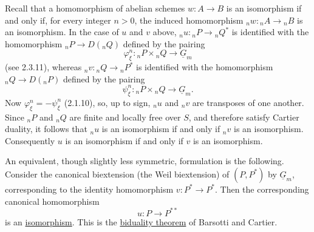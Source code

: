 Recall that a homomorphism of abelian schemes $w:A\longrightarrow B$
is an isomorphism if and only if, for every integer $n>0$, the induced
homomorphism ${}_nw:{}_nA\longrightarrow{}_nB$ is an isomorphism.  In
the case of $u$ and $v$ above, ${}_nu:{}_nP\longrightarrow{}_nQ^*$ is
identified with the homomorphism
${}_nP\longrightarrow D({}_nQ)$ defined by the pairing
\[
 \varphi_\xi^n:{}_nP\times{}_nQ\longrightarrow\underline G_m
\]
(see 2.3.11), whereas ${}_nv:{}_nQ\longrightarrow{}_nP^*$ is
identified with the homomorphism
${}_nQ\longrightarrow D({}_nP)$ defined by the pairing
\[
 \psi_\xi^n:{}_nP\times{}_nQ\longrightarrow\underline G_m.
\]
Now $\varphi_\xi^n=-\psi_\xi^n$ (2.1.10), so, up to sign,
${}_nu$ and ${}_nv$ are transposes of one another.  Since ${}_nP$ and
${}_nQ$ are finite and locally free over $S$, and therefore satisfy
Cartier duality, it follows that ${}_nu$ is an isomorphism if and only
if ${}_nv$ is an isomorphism.  Consequently $u$ is an isomorphism if
and only if $v$ is an isomorphism.

An equivalent, though slightly less symmetric, formulation is the
following.  Consider the canonical biextension (the Weil
biextension) of $(P,P^*)$ by $\underline G_m$, corresponding to the
identity homomorphism $v:P^*\longrightarrow P^*$.  Then the
corresponding canonical homomorphism
\[
 u:P\longrightarrow P^{**}
\]
is an \underline{isomorphism}.  This is the \underline{biduality
theorem} of Barsotti and Cartier.


